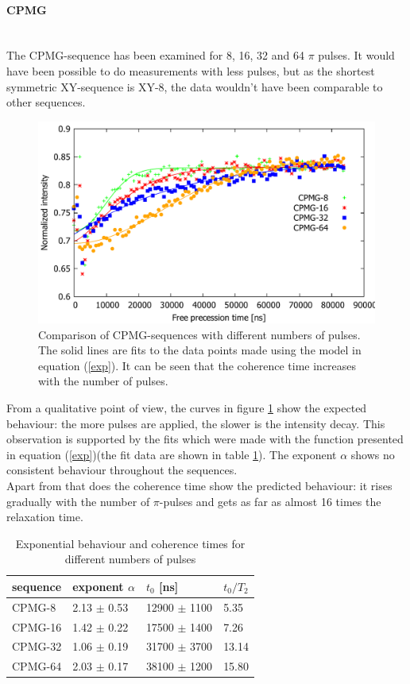 \documentclass[12pt,a4paper]{article}
\begin{document}
\paragraph{CPMG}\mbox{}\\
The CPMG-sequence has been examined for 8, 16, 32 and 64 $\pi$ pulses. It would have been possible to do measurements with less pulses, but as the shortest symmetric XY-sequence is XY-8, the data wouldn't have been comparable to other sequences.\\
\begin{figure}[H]
\includegraphics[scale=0.6]{4cpmgo1pt.pdf} 
\caption{Comparison of CPMG-sequences with different numbers of pulses. The solid lines are fits to the data points made using the model in equation (\ref{exp}). It can be seen that the coherence time increases with the number of pulses.}
\label{C4}
\end{figure}
From a qualitative point of view, the curves in figure \ref{C4} show the expected behaviour: the more pulses are applied, the slower is the intensity decay. This observation is supported by the fits which were made with the function presented in equation (\ref{exp})(the fit data are shown in table \ref{ct}). The exponent $\alpha$ shows no consistent behaviour throughout the sequences. \\
Apart from that does the coherence time show the predicted behaviour: it rises gradually with the number of $\pi$-pulses and gets as far as almost 16 times the relaxation time.\\
\begin{table}[H]
\centering
\caption{Exponential behaviour and coherence times for different numbers of pulses}
\label{ct}
\begin{tabular}{l|ll|l}
sequence & exponent $\alpha$             & $t_0$ {[}ns{]}  & $t_0/T_2$                     \\\hline
CPMG-8   & 2.13  $\pm$ 0.53 & 12900           $\pm$ 1100 & 5.35\\
CPMG-16  & 1.42  $\pm$ 0.22 & 17500            $\pm$ 1400 &7.26\\
CPMG-32  & 1.06  $\pm$ 0.19 & 31700         $\pm$ 3700 & 13.14\\
CPMG-64  & 2.03  $\pm$ 0.17  & 38100        $\pm$ 1200 & 15.80
\end{tabular}
\end{table}
\end{document}
